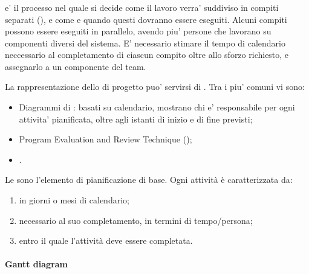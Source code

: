 \subsubsection{}


 e' il processo nel quale si decide come il lavoro
verra' suddiviso in compiti separati (), e come e quando questi
dovranno essere eseguiti. Alcuni compiti possono essere eseguiti in parallelo,
avendo piu' persone che lavorano su componenti diversi del sistema. E'
necessario stimare il tempo di calendario neccessario al completamento di
ciascun compito oltre allo sforzo richiesto, e assegnarlo a un componente del
team.


La rappresentazione dello  di progetto puo' servirsi di
. Tra i piu' comuni vi sono:

\begin{itemize}
  \item Diagrammi di : basati su calendario, mostrano chi e'
    responsabile per ogni attivita' pianificata, oltre agli istanti di inizio e
    di fine previsti;
  \item Program Evaluation and Review Technique ();
  \item {}.
\end{itemize}

Le  sono l'elemento di pianificazione di base. Ogni
attività è caratterizzata da:

\begin{enumerate}
  \item {} in giorni o mesi di calendario;
  \item {} necessario al suo completamento, in termini di
    tempo/persona;
  \item {} entro il quale l'attività deve essere
    completata.
\end{enumerate}

\paragraph{Gantt diagram}

